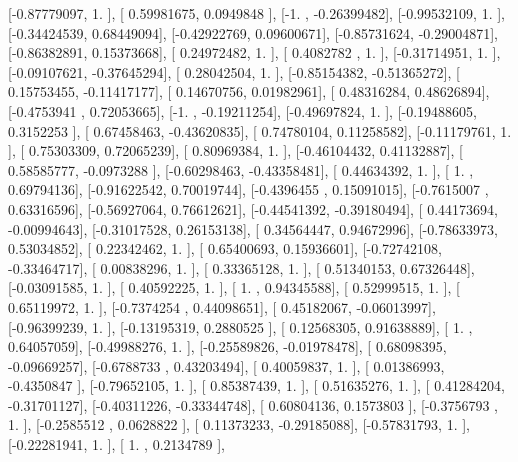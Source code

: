 \documentclass{article}
\begin{document}
       [-0.87779097,  1.        ],
       [ 0.59981675,  0.0949848 ],
       [-1.        , -0.26399482],
       [-0.99532109,  1.        ],
       [-0.34424539,  0.68449094],
       [-0.42922769,  0.09600671],
       [-0.85731624, -0.29004871],
       [-0.86382891,  0.15373668],
       [ 0.24972482,  1.        ],
       [ 0.4082782 ,  1.        ],
       [-0.31714951,  1.        ],
       [-0.09107621, -0.37645294],
       [ 0.28042504,  1.        ],
       [-0.85154382, -0.51365272],
       [ 0.15753455, -0.11417177],
       [ 0.14670756,  0.01982961],
       [ 0.48316284,  0.48626894],
       [-0.4753941 ,  0.72053665],
       [-1.        , -0.19211254],
       [-0.49697824,  1.        ],
       [-0.19488605,  0.3152253 ],
       [ 0.67458463, -0.43620835],
       [ 0.74780104,  0.11258582],
       [-0.11179761,  1.        ],
       [ 0.75303309,  0.72065239],
       [ 0.80969384,  1.        ],
       [-0.46104432,  0.41132887],
       [ 0.58585777, -0.0973288 ],
       [-0.60298463, -0.43358481],
       [ 0.44634392,  1.        ],
       [ 1.        ,  0.69794136],
       [-0.91622542,  0.70019744],
       [-0.4396455 ,  0.15091015],
       [-0.7615007 ,  0.63316596],
       [-0.56927064,  0.76612621],
       [-0.44541392, -0.39180494],
       [ 0.44173694, -0.00994643],
       [-0.31017528,  0.26153138],
       [ 0.34564447,  0.94672996],
       [-0.78633973,  0.53034852],
       [ 0.22342462,  1.        ],
       [ 0.65400693,  0.15936601],
       [-0.72742108, -0.33464717],
       [ 0.00838296,  1.        ],
       [ 0.33365128,  1.        ],
       [ 0.51340153,  0.67326448],
       [-0.03091585,  1.        ],
       [ 0.40592225,  1.        ],
       [ 1.        ,  0.94345588],
       [ 0.52999515,  1.        ],
       [ 0.65119972,  1.        ],
       [-0.7374254 ,  0.44098651],
       [ 0.45182067, -0.06013997],
       [-0.96399239,  1.        ],
       [-0.13195319,  0.2880525 ],
       [ 0.12568305,  0.91638889],
       [ 1.        ,  0.64057059],
       [-0.49988276,  1.        ],
       [-0.25589826, -0.01978478],
       [ 0.68098395, -0.09669257],
       [-0.6788733 ,  0.43203494],
       [ 0.40059837,  1.        ],
       [ 0.01386993, -0.4350847 ],
       [-0.79652105,  1.        ],
       [ 0.85387439,  1.        ],
       [ 0.51635276,  1.        ],
       [ 0.41284204, -0.31701127],
       [-0.40311226, -0.33344748],
       [ 0.60804136,  0.1573803 ],
       [-0.3756793 ,  1.        ],
       [-0.2585512 ,  0.0628822 ],
       [ 0.11373233, -0.29185088],
       [-0.57831793,  1.        ],
       [-0.22281941,  1.        ],
       [ 1.        ,  0.2134789 ],
\end{document}
